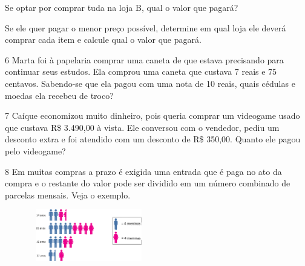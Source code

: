 \begin{multicols}{2}
\begin{escolha}

\item Se optar por comprar tuda na loja B, qual o valor que pagará?


\item Se ele quer pagar o menor preço possível, determine em qual loja ele
  deverá comprar cada item e calcule qual o valor que pagará.

\end{escolha}

\num{6} Marta foi à papelaria comprar uma caneta de que estava precisando para
continuar seus estudos. Ela comprou uma caneta que custava 7 reais e 75
centavos. Sabendo-se que ela pagou com uma nota de 10 reais, quais
cédulas e moedas ela recebeu de troco?


\num{7} Caíque economizou muito dinheiro, pois queria comprar um videogame usado
que custava R\$ 3.490,00 à vista. Ele conversou com o vendedor, pediu
um desconto extra e foi atendido com um desconto de R\$ 350,00. Quanto ele pagou pelo videogame?


\num{8} Em muitas compras a prazo é exigida uma entrada que é paga no ato da
compra e o restante do valor pode ser dividido em um número combinado de
parcelas mensais. Veja o exemplo.

\includegraphics[width=2.90025in,height=0.89174in]{media/image76.png}



\end{multicols}

